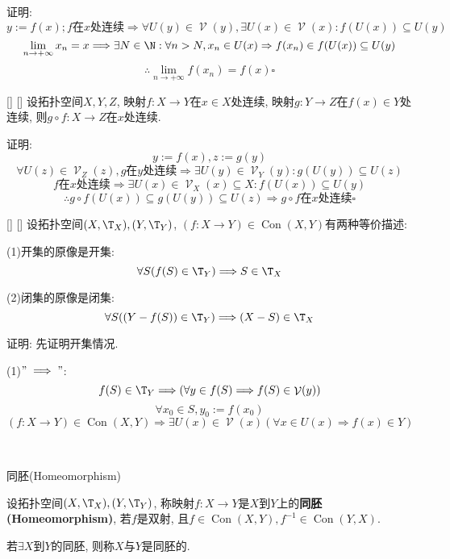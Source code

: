 \documentclass[UTF8]{ctexart}
\DeclareMathOperator{\Con}{Con}
\DeclareMathOperator{\V}{\mathcal{V}}
\begin{document}
            证明: 
                \[y:=f(x); f\text{在$x$处连续}\Longrightarrow\forall U(y)\in\V(y), \exists U(x)\in\V(x): f(U(x))\subseteq U(y)\]
                \[\lim_{n\to+\infty}x_n=x\Longrightarrow\exists N\in\N: \forall n>N, x_n\in U(x)\Rightarrow f(x_n)\in f(U(x))\subseteq U(y)\]
                \[\therefore\lim_{n\to+\infty}f(x_n)=f(x)\square\]
            
            \begin{thm}
                []
                {}
                []
                []
                设拓扑空间$X,Y,Z$, 映射$f:X\to Y$在$x\in X$处连续, 映射$g:Y\to Z$在$f(x)\in Y$处连续, 则$g\circ f:X\to Z$在$x$处连续. 
            \end{thm}

            证明: 
                \[y:=f(x), z:=g(y)\]
                \[\forall U(z)\in\V_Z(z), g\text{在$y$处连续}\Longrightarrow\exists U(y)\in\V_Y(y): g(U(y))\subseteq U(z)\]
                \[f\text{在$x$处连续}\Longrightarrow\exists U(x)\in\V_X(x)\subseteq X: f(U(x))\subseteq U(y)\]
                \[\therefore g\circ f(U(x))\subseteq g(U(y))\subseteq U(z)\Longrightarrow g\circ f\text{在$x$处连续}\square\]

            \begin{thm}
                []
                {}
                []
                []
                设拓扑空间$(X,\T_X), (Y,\T_Y)$, $(f:X\to Y)\in\Con(X,Y)$有两种等价描述: 
                
                (1)开集的原像是开集: 
                \[\forall S(f(S)\in\T_Y)\Longrightarrow S\in\T_X\]
                
                (2)闭集的原像是闭集: 
                \[\forall S((Y-f(S))\in\T_Y)\Longrightarrow(X-S)\in\T_X\]
            \end{thm}

            证明: 先证明开集情况. 

            (1)\("\implies"\): 
                \[f(S)\in\T_Y\Longrightarrow(\forall y\in f(S)\Longrightarrow f(S)\in\V(y))\]
                \[\forall x_0\in S, y_0:=f(x_0)\]
                \[(f:X\to Y)\in\Con(X,Y)\Longrightarrow\exists U(x)\in\V(x)(\forall x\in U(x)\Longrightarrow f(x)\in Y)\]

            \[\]\\

            \begin{dfn}
                {同胚(Homeomorphism)}

                设拓扑空间$(X,\T_X), (Y,\T_Y)$, 称映射$f:X\to Y$是$X$到$Y$上的\textbf{同胚(Homeomorphism)}, 若$f$是双射, 且$f\in\Con(X,Y), f^{-1}\in\Con(Y,X)$. 

                若$\exists X$到$Y$的同胚, 则称$X$与$Y$是同胚的. 
            \end{dfn}
            
\end{document}
